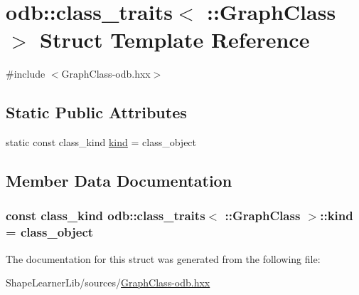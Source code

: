 \hypertarget{structodb_1_1class__traits_3_01_1_1_graph_class_01_4}{}\section{odb\+:\+:class\+\_\+traits$<$ \+:\+:Graph\+Class $>$ Struct Template Reference}
\label{structodb_1_1class__traits_3_01_1_1_graph_class_01_4}


{\ttfamily \#include $<$Graph\+Class-\/odb.\+hxx$>$}

\subsection*{Static Public Attributes}
\begin{DoxyCompactItemize}
\item 
static const class\+\_\+kind \hyperlink{structodb_1_1class__traits_3_01_1_1_graph_class_01_4_afc854963af7377b5d06d2880da4a52fe}{kind} = class\+\_\+object
\end{DoxyCompactItemize}


\subsection{Member Data Documentation}
\hypertarget{structodb_1_1class__traits_3_01_1_1_graph_class_01_4_afc854963af7377b5d06d2880da4a52fe}{}
\subsubsection[{kind}]{\setlength{\rightskip}{0pt plus 5cm}const class\+\_\+kind odb\+::class\+\_\+traits$<$ \+::{\bf Graph\+Class} $>$\+::kind = class\+\_\+object\hspace{0.3cm}{\ttfamily [static]}}\label{structodb_1_1class__traits_3_01_1_1_graph_class_01_4_afc854963af7377b5d06d2880da4a52fe}


The documentation for this struct was generated from the following file\+:\begin{DoxyCompactItemize}
\item 
Shape\+Learner\+Lib/sources/\hyperlink{_graph_class-odb_8hxx}{Graph\+Class-\/odb.\+hxx}\end{DoxyCompactItemize}
